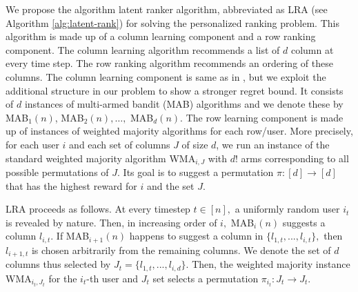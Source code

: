 We propose the algorithm latent ranker algorithm, abbreviated as LRA (see Algorithm \ref{alg:latent-rank}) for solving the personalized ranking problem. This algorithm is made up of a column learning component and a row ranking component. The column learning algorithm recommends a list of $d$ column at every time step. The row ranking algorithm recommends an ordering of these columns. The column learning component is same as in  \citet{radlinski2008learning}, but we exploit the additional structure in our problem to show a stronger regret bound. It consists of $d$ instances of  multi-armed bandit (MAB) algorithms and we denote these by MAB$_1(n)$, MAB$_2(n), \dots,$ MAB$_d(n).$  The row learning component is made up of instances of weighted majority algorithms for each row/user. More precisely, for each user $i$ and each set of columns $J$ of size $d$, we run an instance of the standard weighted majority algorithm WMA$_{i,J}$ with $d!$ arms corresponding to all possible permutations of $J$.  
 Its goal is to suggest a permutation $\pi : [d] \to [d]$ that has the highest reward for $i$ and the set $J$.  


LRA proceeds as follows. At every timestep $t\in[n],$ a uniformly random user $i_t$ is revealed by nature. Then, in increasing order of $i,$ MAB$_i(n)$ suggests a column $l_{i,t}$. If MAB$_{i+1}(n)$ happens to suggest a column in $\{l_{1,t},...,l_{i,t} \},$ then $l_{i+1,t}$ is chosen arbitrarily from the remaining columns. %
We denote the set of $d$ columns thus selected by $J_t = \{ l_{1,t},...,l_{i,d}\}.$ Then, the weighted majority instance WMA$_{i_t,J_t}$ for the $i_t$-th user and $J_t$ set selects a permutation $\pi_{i_t}: J_t \to J_t$.%


